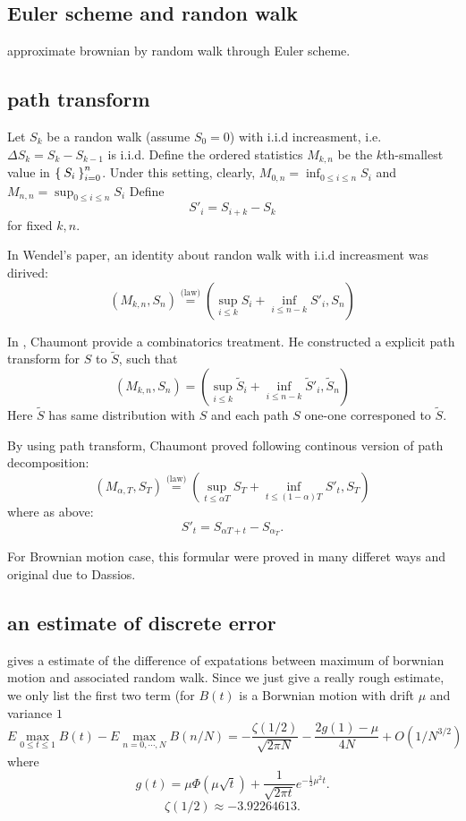 \documentclass[11pt]{book}
\def\eqlaw{{\stackrel{\text{(law)}}{=}}}
\def\tS{{\widetilde{S}}}
\begin{document}
\subsection{Euler scheme and randon walk}
approximate brownian by random walk through Euler scheme.


\subsection{path transform}
Let $S_k$ be a randon walk (assume $S_0=0$) 
with i.i.d increasment, i.e. 
$\Delta S_k = S_k -  S_{k-1}$ is i.i.d. 
Define the ordered statistics $M_{k,n}$ be the $k$th-smallest value in
$\Set{S_i}_{i=0}^n$. 
Under this setting, clearly, $M_{0,n} = \inf_{0\leq i\leq n}S_i$
and $M_{n,n} = \sup_{0\leq i\leq n}S_i$
Define 
\[S'_i = S_{i+k}-S_k\] 
for fixed $k, n$.  

In Wendel's paper\cite{Wendel1960}, an identity about randon walk with 
i.i.d increasment was dirived:
\begin{equation}\label{eq:dpathdec}
(M_{k,n}, S_n) \eqlaw (\sup_{i\leq k} S_i +\inf_{i\leq n-k} S'_i, S_n)
\end{equation}

In 
\cite{Chaumont1999}, Chaumont provide a combinatorics treatment. 
He constructed a explicit path transform for $S$ to $\tS$, such that 
\[
(M_{k,n}, S_n) = (\sup_{i\leq k} \tS_i+\inf_{i\leq n-k} \tS'_i, \tS_n)
\]
Here $\tS$ has same distribution with $S$ and each path $S$
 one-one corresponed to $\tS$.

By using path transform, Chaumont proved 
following continous version of path decomposition:
\begin{equation}\label{eq:cpathdec}
(M_{\alpha,T}, S_T) \eqlaw (\sup_{t\leq \alpha{T}} S_T +\inf_{t \leq (1-\alpha)T} S'_t, S_T)
\end{equation}
where as above:
\[
S'_t = S_{\alpha T+t} - S_{\alpha_T}.
\]

For Brownian motion case, this formular were proved in many differet ways
and original due to Dassios\cite{Dassios1995}. 

\subsection{an estimate of discrete error}
\cite{Janssen2008} gives a estimate of the difference of  expatations 
between maximum of borwnian motion and associated random walk. 
Since we just give a really rough estimate, we only list the first two term
(for $B(t)$ is a Borwnian motion with drift $\mu$ and variance $1$
\begin{equation}\label{eq:est1}
E\max_{0\leq t \leq 1} B(t) - E\max_{n=0,\cdots, N}B(n/N) 
= -\frac{\zeta(1/2)}{\sqrt{2\pi N}}-\frac{2g(1)-\mu}{4N} + O(1/N^{3/2})
\end{equation}
where 
\[
g(t) = \mu \Phi(\mu \sqrt{t}) + \frac{1}{\sqrt{2\pi t}} e^{-\frac{1}{2}\mu^2 t}.
\]
\[
\zeta(1/2) \approx -3.92264613.
\]
\end{document}
